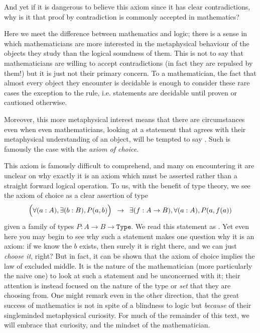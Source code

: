 \documentclass[11pt]{article}
\begin{document}
And yet if it is dangerous to believe this axiom since it has clear contradictions, why is it that proof by contradiction is commonly accepted in mathematics?

Here we meet the difference between mathematics and logic; there is a sense in which mathematicians are more interested in the metaphysical behaviour of the objects they study than the logical soundness of them. This is not to say that mathematicians are willing to accept contradictions (in fact they are repulsed by them!) but it is just not their primary concern. To a mathematician, the fact that almost every object they encounter is decidable is enough to consider these rare cases the exception to the rule, i.e. statements are decidable until proven or cautioned otherwise. 

Moreover, this more metaphysical interest means that there are circumstances even when even mathematicians, looking at a statement that agrees with their metaphysical understanding of an object, will be tempted to say . Such is famously the case with the \emph{axiom of choice}.

This axiom is famously difficult to comprehend, and many on encountering it are unclear on why exactly it is an axiom which must be asserted rather than a straight forward logical operation. To us, with the benefit of type theory, we see the axiom of choice as a clear assertion of type \begin{gather*}
\Big(\forall (a : A), \exists (b : B), P(a,b) \Big) \hspace{0.5em} \to \hspace{0.5em} \exists (f : A \to B), \forall (a : A), P(a,f(a))
\end{gather*}
given a family of types $P \colon A \to B \to \mathtt{Type}$. We read this statement as . Yet even here you may begin to see why such a statement makes one question why it is an axiom: if we know the $b$ exists, then surely it is right there, and we can just \emph{choose it}, right? But in fact, it can be shown that the axiom of choice implies the law of excluded middle. It is the nature of the mathematician (more particularly the naive one) to look at such a statement and be unconcerned with it; their attention is instead focused on the nature of the type or \emph{set} that they are choosing from. One might remark even in the other direction, that the great success of mathematics is not in spite of a blindness to logic but \emph{because} of their singleminded metaphysical curiosity. For much of the remainder of this text, we will embrace that curiosity, and the mindset of the mathematician.
\end{document}
